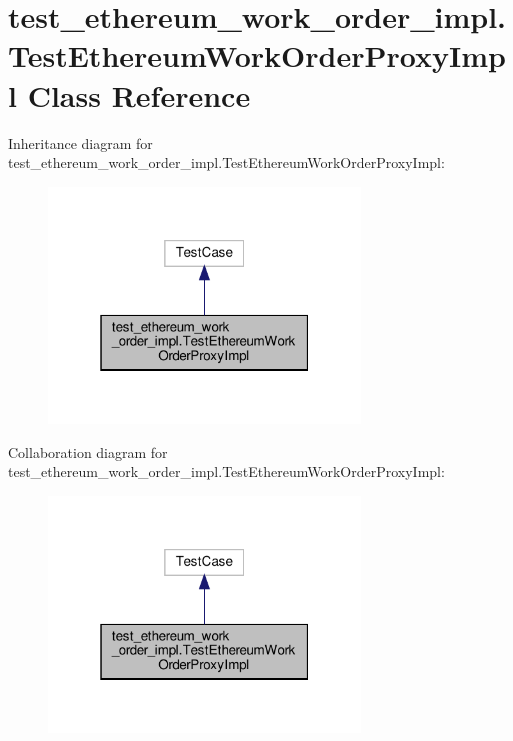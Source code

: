 \hypertarget{classtest__ethereum__work__order__impl_1_1TestEthereumWorkOrderProxyImpl}{}\section{test\+\_\+ethereum\+\_\+work\+\_\+order\+\_\+impl.\+Test\+Ethereum\+Work\+Order\+Proxy\+Impl Class Reference}
\label{classtest__ethereum__work__order__impl_1_1TestEthereumWorkOrderProxyImpl}


Inheritance diagram for test\+\_\+ethereum\+\_\+work\+\_\+order\+\_\+impl.\+Test\+Ethereum\+Work\+Order\+Proxy\+Impl\+:
\nopagebreak
\begin{figure}[H]
\begin{center}
\leavevmode
\includegraphics[width=235pt]{classtest__ethereum__work__order__impl_1_1TestEthereumWorkOrderProxyImpl__inherit__graph}
\end{center}
\end{figure}


Collaboration diagram for test\+\_\+ethereum\+\_\+work\+\_\+order\+\_\+impl.\+Test\+Ethereum\+Work\+Order\+Proxy\+Impl\+:
\nopagebreak
\begin{figure}[H]
\begin{center}
\leavevmode
\includegraphics[width=235pt]{classtest__ethereum__work__order__impl_1_1TestEthereumWorkOrderProxyImpl__coll__graph}
\end{center}
\end{figure}
